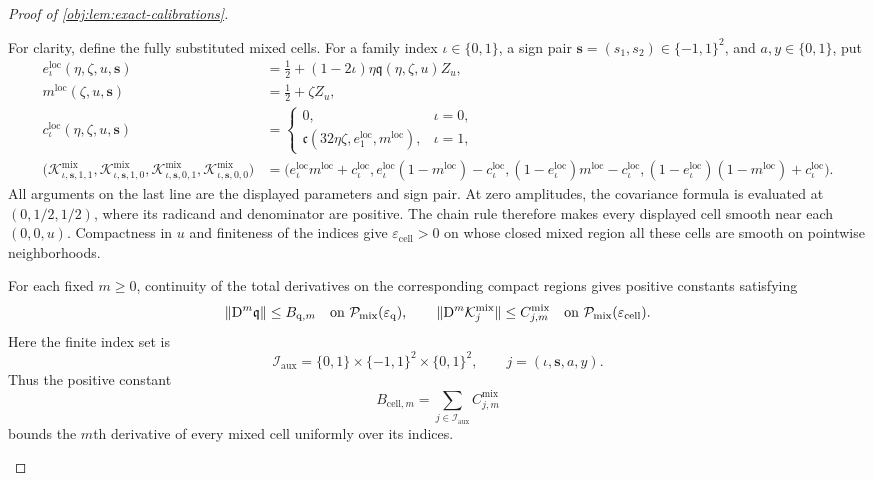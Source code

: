 \documentclass[11pt]{article}
\begin{document}
\begin{proof}[Proof of \cref{obj:lem:exact-calibrations}]
\begin{enumerate}
For clarity, define the fully substituted mixed cells. For a family index
\(\iota\in\{0,1\}\), a sign pair
\(\boldsymbol{s}=(s_1,s_2)\in\{-1,1\}^2\), and
\(a,y\in\{0,1\}\), put
\[
\begin{aligned}
e_{\iota}^{\mathrm{loc}}(\eta,\zeta,u,\boldsymbol{s})
&=\frac12+(1-2\iota)\eta\mathfrak q(\eta,\zeta,u)Z_u,\\
m^{\mathrm{loc}}(\zeta,u,\boldsymbol{s})
&=\frac12+\zeta Z_u,\\
c_{\iota}^{\mathrm{loc}}(\eta,\zeta,u,\boldsymbol{s})
&=
\begin{cases}
0,&\iota=0,\\
\mathfrak c(32\eta\zeta,e_1^{\mathrm{loc}},m^{\mathrm{loc}}),
&\iota=1,
\end{cases}\\
\bigl(
\mathcal K^{\mathrm{mix}}_{\iota,\boldsymbol{s},1,1},
\mathcal K^{\mathrm{mix}}_{\iota,\boldsymbol{s},1,0},
\mathcal K^{\mathrm{mix}}_{\iota,\boldsymbol{s},0,1},
\mathcal K^{\mathrm{mix}}_{\iota,\boldsymbol{s},0,0}
\bigr)
&=
\bigl(
e_{\iota}^{\mathrm{loc}}m^{\mathrm{loc}}+c_{\iota}^{\mathrm{loc}},
e_{\iota}^{\mathrm{loc}}(1-m^{\mathrm{loc}})-c_{\iota}^{\mathrm{loc}},
(1-e_{\iota}^{\mathrm{loc}})m^{\mathrm{loc}}-c_{\iota}^{\mathrm{loc}},
(1-e_{\iota}^{\mathrm{loc}})(1-m^{\mathrm{loc}})
+c_{\iota}^{\mathrm{loc}}
\bigr).
\end{aligned}
\]
All arguments on the last line are the displayed parameters and sign pair. At zero amplitudes, the covariance formula is evaluated at
\((0,1/2,1/2)\), where its radicand and denominator are positive. The chain rule therefore makes every displayed cell smooth near each \((0,0,u)\). Compactness in \(u\) and finiteness of the indices give
\(\varepsilon_{\mathrm{cell}}>0\) on whose closed mixed region all these cells are smooth on pointwise neighborhoods.

For each fixed \(m\ge0\), continuity of the total derivatives on the corresponding compact regions gives positive constants satisfying
\[
\|\mathrm D^m\mathfrak q\|\le B_{\mathrm q,m}
\quad\hbox{on }\mathcal P_{\mathrm{mix}}(\varepsilon_{\mathrm q}),
\qquad
\|\mathrm D^m\mathcal K^{\mathrm{mix}}_j\|
\le C^{\mathrm{mix}}_{j,m}
\quad\hbox{on }\mathcal P_{\mathrm{mix}}(\varepsilon_{\mathrm{cell}}).
\]
Here the finite index set is
\[
\mathcal I_{\mathrm{aux}}
=\{0,1\}\times\{-1,1\}^2\times\{0,1\}^2,
\qquad
j=(\iota,\boldsymbol{s},a,y).
\]
Thus the positive constant
\[
B_{\mathrm{cell},m}
=\sum_{j\in\mathcal I_{\mathrm{aux}}}C^{\mathrm{mix}}_{j,m}
\]
bounds the \(m\)th derivative of every mixed cell uniformly over its indices.


\end{enumerate}
\end{proof}
\end{document}
